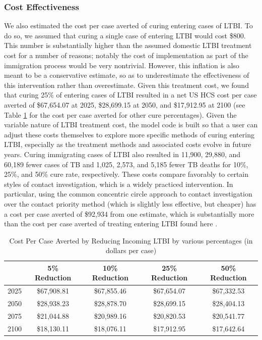 \documentclass{amsart}
\renewcommand{\(}{\left(}
\renewcommand{\)}{\right)}
\begin{document}
\subsubsection{Cost Effectiveness}
We also estimated the cost per case averted of curing entering cases of LTBI. To
do so, we assumed that curing a single case of entering LTBI would cost \$800.
This number is substantially higher than the assumed domestic LTBI treatment
cost for a number of reasons; notably the cost of implementation as part of the
immigration process would be very nontrivial. However, this inflation is also
meant to be a conservative estimate, so as to underestimate the effectiveness of
this intervention rather than overestimate. Given this treatment cost, we found
that curing 25\% of entering cases of LTBI resulted in a net US HCS cost per
case averted of \$67,654.07 at 2025, \$28,699.15 at 2050, and
\$17,912.95 at 2100 (see Table \ref{tab:redEnLTBICosts} for the cost per case
averted for other cure percentages). Given the variable nature of LTBI treatment
cost, the model code is built so that a user can adjust these costs themselves
to explore more specific methods of curing entering LTBI, especially as the
treatment methods and associated costs evolve in future years. Curing
immigrating cases of LTBI  also resulted in 11,900, 29,880, and 60,189 fewer
cases of TB and 1,025, 2,573, and 5,185 fewer TB deaths for 10\%, 25\%, and 50\%
cure rate, respectively. These costs compare favorably to certain styles of
contact investigation, which is a widely practiced intervention. In particular,
using the common concentric circle approach to contact investigation over the contact
priority method (which is slightly less effective, but cheaper) has a cost per case
averted of \$92,934 from one estimate, which is substantially more than the cost
per case averted of treating entering LTBI found here \cite{pisu_targeted_2009}. 

\begin{table}
\centering
\begin{tabular}{|r|cccc|} \hline
      &5\% Reduction&10\% Reduction&25\% Reduction&50\% Reduction\\\hline
  2025& \$67,908.81 & \$67,855.46 & \$67,654.07 & \$67,332.53 \\ 
  2050& \$28,938.23 & \$28,878.70 & \$28,699.15 & \$28,404.13 \\ 
  2075& \$21,044.88 & \$20,989.16 & \$20,820.53 & \$20,541.77 \\ 
  2100& \$18,130.11 & \$18,076.11 & \$17,912.95 & \$17,642.64 \\ \hline
\end{tabular}
\caption{Cost Per Case Averted by Reducing Incoming LTBI by various percentages
(in dollars per case)} 
\label{tab:redEnLTBICosts}
\end{table}
\end{document}
